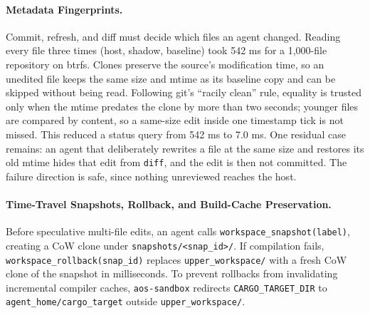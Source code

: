 \documentclass[acmsmall,screen,review]{acmart}
\begin{document}
\paragraph{Metadata Fingerprints.} Commit, refresh, and diff must decide which files an agent changed. Reading every file three times (host, shadow, baseline) took 542 ms for a 1,000-file repository on btrfs. Clones preserve the source's modification time, so an unedited file keeps the same size and mtime as its baseline copy and can be skipped without being read. Following git's ``racily clean'' rule, equality is trusted only when the mtime predates the clone by more than two seconds; younger files are compared by content, so a same-size edit inside one timestamp tick is not missed. This reduced a status query from 542 ms to 7.0 ms. One residual case remains: an agent that deliberately rewrites a file at the same size and restores its old mtime hides that edit from \texttt{diff}, and the edit is then not committed. The failure direction is safe, since nothing unreviewed reaches the host.

\paragraph{Time-Travel Snapshots, Rollback, and Build-Cache Preservation.} Before speculative multi-file edits, an agent calls \texttt{workspace\_snapshot(label)}, creating a CoW clone under \texttt{snapshots/<snap\_id>/}. If compilation fails, \texttt{workspace\_rollback(snap\_id)} replaces \texttt{upper\_workspace/} with a fresh CoW clone of the snapshot in milliseconds. To prevent rollbacks from invalidating incremental compiler caches, \texttt{aos-sandbox} redirects \texttt{CARGO\_TARGET\_DIR} to \texttt{agent\_home/cargo\_target} outside \texttt{upper\_workspace/}.
\end{document}
